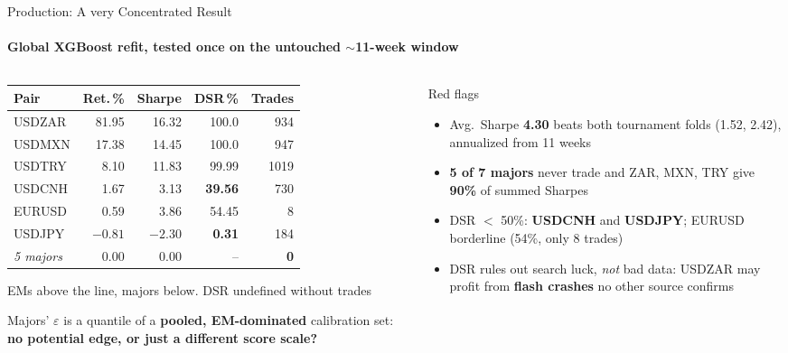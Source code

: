 \documentclass[aspectratio=169, 11pt]{beamer}
\newcommand{\hl}[1]{\textcolor{unibored}{\textbf{#1}}}
\newcommand{\negv}[1]{\textcolor{bad}{\textbf{#1}}}
\begin{document}
\begin{frame}{Production: A very Concentrated Result}
  \framesubtitle{Global XGBoost refit, tested once on the untouched $\sim$11-week window}
  \begin{columns}[T,onlytextwidth]
    \begin{column}{0.44\textwidth}
      \centering
      \footnotesize
      \setlength{\tabcolsep}{3pt}
      \begin{tabular}{l|rrrr}
        \toprule
        Pair & Ret.\,\% & Sharpe & DSR\,\% & Trades \\
        \midrule
        USDZAR & 81.95 & 16.32 & 100.0 & 934 \\
        USDMXN & 17.38 & 14.45 & 100.0 & 947 \\
        USDTRY & 8.10 & 11.83 & 99.99 & 1019 \\
        USDCNH & 1.67 & 3.13 & \negv{39.56} & 730 \\
        \midrule
        EURUSD & 0.59 & 3.86 & 54.45 & 8 \\
        USDJPY & $-0.81$ & $-2.30$ & \negv{0.31} & 184 \\
        \textit{5 majors} & 0.00 & 0.00 & -- & \negv{0} \\
        \bottomrule
      \end{tabular}

      \vspace{0.5mm}
      {\scriptsize\color{muted} EMs above the line, majors below. DSR undefined without trades}
      \vspace{3mm}

      \raggedright
      \footnotesize
      Majors' $\varepsilon$ is a quantile of a \hl{pooled, EM-dominated} calibration set:
      \textbf{no potential edge, or just a different score scale?}
    \end{column}
    \begin{column}{0.51\textwidth}
      \begin{alertblock}{Red flags}
        \footnotesize
        \begin{itemize}
          \setlength{\itemsep}{0.8mm}
          \item Avg.\ Sharpe \hl{4.30} beats both tournament folds (1.52, 2.42), annualized from 11 weeks
          \item \hl{5 of 7 majors} never trade and ZAR, MXN, TRY give \hl{90\%} of summed Sharpes
          \item DSR $<$ 50\%: \hl{USDCNH} and \hl{USDJPY}; EURUSD borderline (54\%, only 8 trades)
          \item DSR rules out search luck, \emph{not} bad data: USDZAR may profit from \hl{flash crashes} no other source confirms
        \end{itemize}
      \end{alertblock}
    \end{column}
  \end{columns}
\end{frame}
\end{document}
